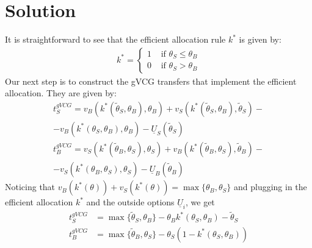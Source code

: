 \documentclass[a4paper]{article}
\newif\ifsolutions
\begin{document}
\ifsolutions
\section*{Solution}
It is straightforward to see that the efficient allocation rule $k^*$ is given by:
\begin{align*}
	k^*= \begin{cases}
		1 & \text{ if } \theta_S \leq \theta_B \\ 
		0 & \text{ if } \theta_S > \theta_B
	\end{cases}
\end{align*}
Our next step is to construct the gVCG transfers that implement the efficient allocation. They are given by:
\begin{align*}
	t_S^{gVCG} = v_B(k^*(\tilde{\theta}_S,\theta_B),\theta_B) + v_S(k^*(\tilde{\theta}_S,\theta_B),\tilde{\theta}_S) - \\
	-v_B(k^*(\theta_S,\theta_B),\theta_B) - \underline{U}_S(\tilde{\theta}_S)
	\\
	t_B^{gVCG} = v_S(k^*(\tilde{\theta}_B,\theta_S),\theta_S) + v_B(k^*(\tilde{\theta}_B,\theta_S),\tilde{\theta}_B) - \\
	-v_S(k^*(\theta_B,\theta_S),\theta_S) - \underline{U}_B(\tilde{\theta}_B)
\end{align*}
Noticing that $v_B(k^*(\theta))+v_S(k^*(\theta)) = \max \{\theta_B,\theta_S\}$ and plugging in the efficient allocation $k^*$ and the outside options $\underline{U}_i$, we get
\begin{align*}
	t_S^{gVCG} &= \max\{\tilde{\theta}_S,\theta_B\} - \theta_B k^*(\theta_S,\theta_B) - \tilde{\theta}_S
	\\
	t_B^{gVCG} &= \max\{\tilde{\theta}_B,\theta_S\} - \theta_S \left(1 - k^*(\theta_S,\theta_B)\right)
\end{align*}
\end{document}
